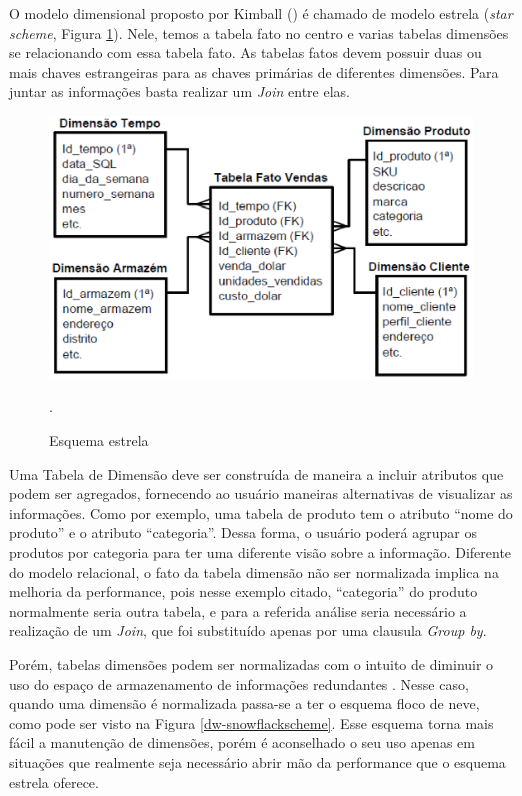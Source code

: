 %

O modelo dimensional proposto por Kimball (\citeyear{kimball2002}) é chamado de modelo estrela (\emph{star scheme}, Figura \ref{dw-starscheme}). Nele, temos a tabela fato no centro e varias tabelas dimensões se relacionando com essa tabela fato. As tabelas fatos devem possuir duas ou mais chaves estrangeiras para as chaves primárias de diferentes dimensões. Para juntar as informações basta realizar um \emph{Join} entre elas.

 \begin{figure}[!htb]
 	\centering
 		\includegraphics[scale=0.8]{figuras/dw-Modelo-estrela}
 		\caption{Esquema estrela}.
 		\label{dw-starscheme}
 \end{figure}

%

Uma Tabela de Dimensão deve ser construída de maneira a incluir atributos que podem ser agregados, fornecendo ao usuário maneiras alternativas de visualizar as informações. Como por exemplo, uma tabela de produto tem o atributo “nome do produto” e o atributo “categoria”. Dessa forma, o usuário poderá agrupar os produtos por categoria para ter uma diferente visão sobre a informação. Diferente do modelo relacional, o fato da tabela dimensão não ser normalizada implica na melhoria da performance, pois nesse exemplo citado, “categoria” do produto normalmente seria outra tabela, e para a referida análise seria necessário a realização de um \emph{Join}, que foi substituído apenas por uma clausula \emph{Group by}.

%

Porém, tabelas dimensões podem ser normalizadas com o intuito de diminuir o uso do espaço de armazenamento de informações redundantes \cite{kimball2002}. Nesse caso, quando uma dimensão é normalizada passa-se a ter o esquema floco de neve, como pode ser visto na Figura \ref{dw-snowflackscheme}. Esse esquema torna mais fácil a manutenção de dimensões, porém é aconselhado o seu uso apenas em situações que realmente seja necessário abrir mão da performance que o esquema estrela oferece.

